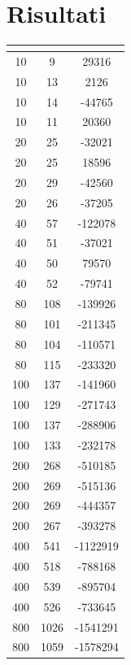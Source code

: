 \section{Risultati}

\renewcommand{\arraystretch}{1.5}
\begin{longtable}{|c|c|c|}
	\hline
	\rowcolor{title_row}
	\textbf{\color{title_text}{num\_vertici}} & \textbf{\color{title_text}{num\_archi}} & \textbf{\color{title_text}{MST}}\\
	\hline
	\endhead
	10 & 9 & 29316 \\ \hline 
	10 & 13 & 2126 \\ \hline 
	10 & 14 & -44765 \\ \hline
	10 & 11 & 20360 \\ \hline
	20 & 25 & -32021 \\ \hline
	20 & 25 & 18596 \\ \hline
	20 & 29 & -42560 \\ \hline
	20 & 26 & -37205 \\ \hline
	40 & 57 & -122078 \\ \hline
	40 & 51 & -37021 \\ \hline
	40 & 50 & 79570 \\ \hline
	40 & 52 & -79741 \\ \hline
	80 & 108 & -139926 \\ \hline
	80 & 101 & -211345 \\ \hline
	80 & 104 & -110571 \\ \hline
	80 & 115 & -233320 \\ \hline
	100 & 137 & -141960 \\ \hline
	100 & 129 & -271743 \\ \hline
	100 & 137 & -288906 \\ \hline
	100 & 133 & -232178 \\ \hline
	200 & 268 & -510185 \\ \hline
	200 & 269 & -515136 \\ \hline
	200 & 269 & -444357 \\ \hline
	200 & 267 & -393278 \\ \hline
	400 & 541 & -1122919 \\ \hline
	400 & 518 & -788168 \\ \hline
	400 & 539 & -895704 \\ \hline
	400 & 526 & -733645 \\ \hline
	800 & 1026 & -1541291 \\ \hline
	800 & 1059 & -1578294 \\ \hline

\end{longtable}
